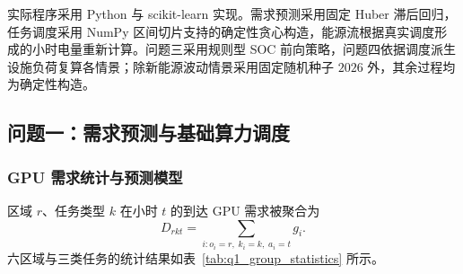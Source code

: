 \documentclass[withoutpreface,bwprint]{cumcmthesis}
\begin{document}

实际程序采用 Python 与 scikit-learn 实现。需求预测采用固定 Huber 滞后回归，任务调度采用 NumPy 区间切片支持的确定性贪心构造，能源流根据真实调度形成的小时电量重新计算。问题三采用规则型 SOC 前向策略，问题四依据调度派生设施负荷复算各情景；除新能源波动情景采用固定随机种子 $2026$ 外，其余过程均为确定性构造。

\subsection{问题一：需求预测与基础算力调度}

\subsubsection{GPU 需求统计与预测模型}

区域 $r$、任务类型 $k$ 在小时 $t$ 的到达 GPU 需求被聚合为
\begin{equation}
D_{rkt}=\sum_{i:o_i=r,\;k_i=k,\;a_i=t}g_i.
\end{equation}
六区域与三类任务的统计结果如表~\ref{tab:q1_group_statistics} 所示。
\end{document}

